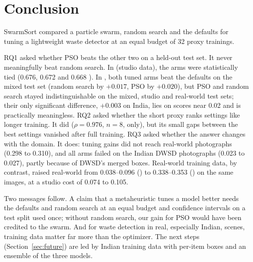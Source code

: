 \section{Conclusion}
\label{sec:conclusion}

SwarmSort compared a particle swarm, random search and the defaults for tuning a lightweight waste detector at an equal budget of 32 proxy trainings.

RQ1 asked whether PSO beats the other two on a held-out test set. It never meaningfully beat random search. In \genone (studio data), the arms were statistically tied (0.676, 0.672 and 0.668 \mapfifty). In \gentwo, both tuned arms beat the defaults on the mixed test set (random search by $+0.017$, PSO by $+0.020$), but PSO and random search stayed indistinguishable on the mixed, studio and real-world test sets; their only significant difference, $+0.003$ on India, lies on scores near 0.02 and is practically meaningless. RQ2 asked whether the short proxy ranks settings like longer training. It did ($\rho = 0.976$, $n = 8$, \genone only), but its small gaps between the best settings vanished after full training. RQ3 asked whether the answer changes with the domain. It does: tuning gains did not reach real-world photographs (0.298 to 0.310), and all arms failed on the Indian DWSD photographs (0.023 to 0.027), partly because of DWSD's merged boxes. Real-world training data, by contrast, raised real-world \mapfifty from 0.038--0.096 (\genone) to 0.338--0.353 (\gentwo) on the same images, at a studio cost of 0.074 to 0.105.

Two messages follow. A claim that a metaheuristic tunes a model better needs the defaults and random search at an equal budget and confidence intervals on a test split used once; without random search, our \gentwo gain for PSO would have been credited to the swarm. And for waste detection in real, especially Indian, scenes, training data matter far more than the optimizer. The next steps (Section~\ref{sec:future}) are led by Indian training data with per-item boxes and an ensemble of the three models.

